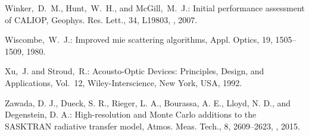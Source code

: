 \documentclass[amt]{copernicus}
\begin{document}
\begin{thebibliography}{99}
Winker,~D.~M., Hunt,~W.~H., and McGill,~M.~J.: Initial performance assessment
of CALIOP, Geophys. Res. Lett., 34, L19803, , 2007.


Wiscombe,~W.~J.: Improved mie scattering algorithms, Appl. Optics, 19,
1505--1509, 1980.


Xu,~J. and Stroud,~R.: Acousto-Optic Devices: Principles, Design, and
Applications, Vol.~12, Wiley-Interscience, New York, USA, 1992.


Zawada, D. J., Dueck, S. R., Rieger, L. A., Bourassa, A. E., Lloyd, N. D.,
and Degenstein, D. A.: High-resolution and Monte Carlo additions to the
SASKTRAN radiative transfer model, Atmos. Meas. Tech., 8, 2609--2623,
, 2015.

\end{thebibliography}
\end{document}
